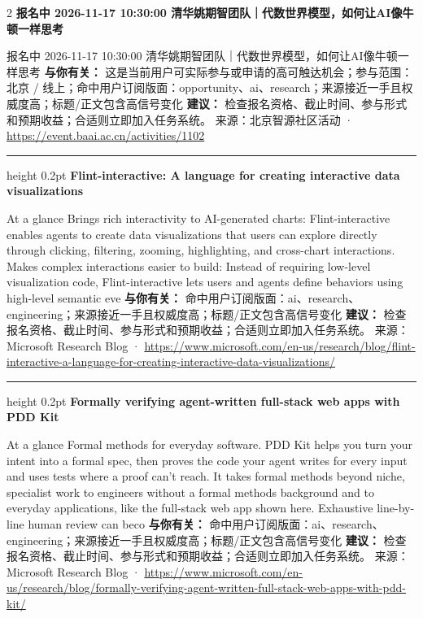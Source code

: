 \documentclass[10.5pt]{ctexart}
\begin{document}
\begin{multicols}{2}
{\large\bfseries 报名中 2026-11-17 10:30:00 清华姚期智团队｜代数世界模型，如何让AI像牛顿一样思考}\par
报名中 2026-11-17 10:30:00 清华姚期智团队｜代数世界模型，如何让AI像牛顿一样思考
\textbf{与你有关：} 这是当前用户可实际参与或申请的高可触达机会；参与范围：北京 / 线上；命中用户订阅版面：opportunity、ai、research；来源接近一手且权威度高；标题/正文包含高信号变化
\textbf{建议：} 检查报名资格、截止时间、参与形式和预期收益；合适则立即加入任务系统。
{\footnotesize\color{ormuted} 来源：北京智源社区活动 · \url{https://event.baai.ac.cn/activities/1102}}
\vspace{2mm}
\hrule height 0.2pt
\vspace{2mm}
{\large\bfseries Flint-interactive: A language for creating interactive data visualizations}\par
At a glance Brings rich interactivity to AI-generated charts: Flint-interactive enables agents to create data visualizations that users can explore directly through clicking, filtering, zooming, highlighting, and cross-chart interactions. Makes complex interactions easier to build: Instead of requiring low-level visualization code, Flint-interactive lets users and agents define behaviors using high-level semantic eve
\textbf{与你有关：} 命中用户订阅版面：ai、research、engineering；来源接近一手且权威度高；标题/正文包含高信号变化
\textbf{建议：} 检查报名资格、截止时间、参与形式和预期收益；合适则立即加入任务系统。
{\footnotesize\color{ormuted} 来源：Microsoft Research Blog · \url{https://www.microsoft.com/en-us/research/blog/flint-interactive-a-language-for-creating-interactive-data-visualizations/}}
\vspace{2mm}
\hrule height 0.2pt
\vspace{2mm}
{\large\bfseries Formally verifying agent-written full-stack web apps with PDD Kit}\par
At a glance Formal methods for everyday software. PDD Kit helps you turn your intent into a formal spec, then proves the code your agent writes for every input and uses tests where a proof can’t reach. It takes formal methods beyond niche, specialist work to engineers without a formal methods background and to everyday applications, like the full-stack web app shown here. Exhaustive line-by-line human review can beco
\textbf{与你有关：} 命中用户订阅版面：ai、research、engineering；来源接近一手且权威度高；标题/正文包含高信号变化
\textbf{建议：} 检查报名资格、截止时间、参与形式和预期收益；合适则立即加入任务系统。
{\footnotesize\color{ormuted} 来源：Microsoft Research Blog · \url{https://www.microsoft.com/en-us/research/blog/formally-verifying-agent-written-full-stack-web-apps-with-pdd-kit/}}

\end{multicols}
\end{document}
